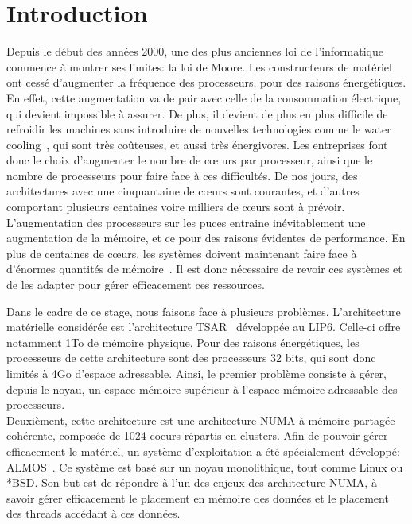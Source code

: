 \chapter{Introduction}

  \hspace{1cm}Depuis le début des années 2000, une des plus anciennes loi de
  l'informatique commence à montrer ses limites: la loi de Moore. Les
  constructeurs de matériel ont cessé d'augmenter la fréquence des processeurs,
  pour des raisons énergétiques. En effet, cette augmentation va de pair avec
  celle de la consommation électrique, qui devient impossible à assurer. De
  plus, il devient de plus en plus difficile de refroidir les machines sans
  introduire de nouvelles technologies comme le water
  cooling~\citep{googleXXXXdatacenters}, qui sont très coûteuses, et aussi très
  énergivores. Les entreprises font donc le choix d'augmenter le nombre de c\oe
  urs par processeur, ainsi que le nombre de processeurs pour faire face à ces
  difficultés. De nos jours, des architectures avec une cinquantaine de c\oe urs
  sont courantes, et d'autres comportant plusieurs centaines voire milliers de
  c\oe urs sont à prévoir. L'augmentation des processeurs sur les puces entraine
  inévitablement une augmentation de la mémoire, et ce pour des raisons
  évidentes de performance. En plus de centaines de c\oe urs, les systèmes
  doivent maintenant faire face à d'énormes quantités de
  mémoire~\citep{hp2012z820, puget2013z9pe}. Il est donc nécessaire de revoir
  ces systèmes et de les adapter pour gérer efficacement ces ressources.\newline

  \hspace{1cm} Dans le cadre de ce stage, nous faisons face à plusieurs
  problèmes. L'architecture matérielle considérée est l'architecture
  TSAR~\citep{greiner2009tsar} développée au LIP6. Celle-ci offre notamment 1To
  de mémoire physique. Pour des raisons énergétiques, les processeurs de cette
  architecture sont des processeurs 32 bits, qui sont donc limités à 4Go
  d'espace adressable. Ainsi, le premier problème consiste à gérer, depuis le
  noyau, un espace mémoire supérieur à l'espace mémoire adressable des
  processeurs.\\

  Deuxièment, cette architecture est une architecture NUMA à mémoire partagée
  cohérente, composée de 1024 coeurs répartis en clusters. Afin de pouvoir gérer
  efficacement le matériel, un système d'exploitation a été spécialement
  développé: ALMOS~\citep{almaless2011almos}. Ce système est basé sur un noyau
  monolithique, tout comme Linux ou *BSD. Son but est de répondre à l'un des
  enjeux des architecture NUMA, à savoir gérer efficacement le placement en
  mémoire des données et le placement des threads accédant à ces
  données. \\

